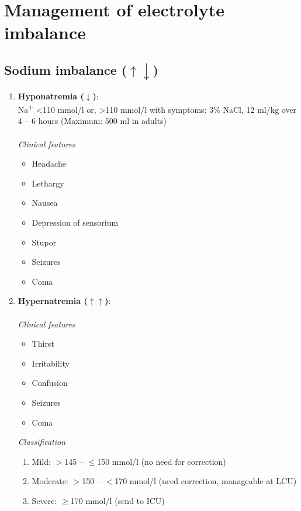 \documentclass[11pt,a4paper]{report}
\begin{document}
\chapter[Management of Electrolyte Imbalance]{Management of electrolyte imbalance}

\section[Sodium imbalance]{Sodium imbalance ({\color{red}$\uparrow\downarrow$})} 
\begin{enumerate}
	\item \textbf{Hyponatremia ($\downarrow$)}: \\
	Na\textsuperscript{+} \textless 110 mmol/l or, \textgreater 110 mmol/l with symptoms: 3\% NaCl, 12 ml/kg over 4 -- 6 hours (Maximum: 500 ml in adults) \\
	~\\
	\textit{Clinical features}
	\begin{itemize}
		\item Headache
		\item Lethargy
		\item Nausea
		\item Depression of sensorium 
		\item Stupor 
		\item Seizures
		\item Coma
	\end{itemize}
	\item \textbf{Hypernatremia ($\uparrow\uparrow$)}: \\
	~\\
	\textit{Clinical features}
	\begin{itemize}
		\item Thirst
		\item Irritability 
		\item Confusion
		\item Seizures
		\item Coma 
	\end{itemize}
	\textit{Classification}
	\begin{enumerate}
		\item Mild: $>$145 -- $\leq$150 mmol/l (no need for correction)
		\item Moderate: $>$150 -- $<$170 mmol/l (need correction, manageable at LCU)
		\item Severe: $\geq$170 mmol/l (send to ICU)
	\end{enumerate}
	

\end{enumerate}
\end{document}
